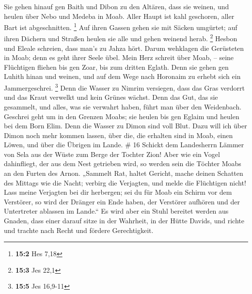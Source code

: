 Sie gehen hinauf gen Baith und Dibon zu den Altären, dass
sie weinen, und heulen über Nebo und Medeba in Moab. Aller Haupt ist
kahl geschoren, aller Bart ist abgeschnitten. \footnote{\textbf{15:2}
  Hes 7,18}  Auf ihren Gassen gehen sie mit Säcken umgürtet;
auf ihren Dächern und Straßen heulen sie alle und gehen weinend herab.
\footnote{\textbf{15:3} Jes 22,1}  Hesbon und Eleale
schreien, dass man's zu Jahza hört. Darum wehklagen die Gerüsteten in
Moab; denn es geht ihrer Seele übel.  Mein Herz schreit über
Moab, -- seine Flüchtigen fliehen bis gen Zoar, bis zum dritten Eglath.
Denn sie gehen gen Luhith hinan und weinen, und auf dem Wege nach
Horonaim zu erhebt sich ein Jammergeschrei. \footnote{\textbf{15:5} Jes
  16,9-11}  Denn die Wasser zu Nimrim versiegen, dass das
Gras verdorrt und das Kraut verwelkt und kein Grünes wächst.
 Denn das Gut, das sie gesammelt, und alles, was sie
verwahrt haben, führt man über den Weidenbach.  Geschrei
geht um in den Grenzen Moabs; sie heulen bis gen Eglaim und heulen bei
dem Born Elim.  Denn die Wasser zu Dimon sind voll Blut.
Dazu will ich über Dimon noch mehr kommen lassen, über die, die erhalten
sind in Moab, einen Löwen, und über die Übrigen im Lande. \# 16
 Schickt dem Landesherrn Lämmer von Sela aus der Wüste zum
Berge der Tochter Zion!  Aber wie ein Vogel dahinfliegt, der
aus dem Nest getrieben wird, so werden sein die Töchter Moabs an den
Furten des Arnon.  „Sammelt Rat, haltet Gericht, mache
deinen Schatten des Mittags wie die Nacht; verbirg die Verjagten, und
melde die Flüchtigen nicht!  Lass meine Verjagten bei dir
herbergen; sei du für Moab ein Schirm vor dem Verstörer, so wird der
Dränger ein Ende haben, der Verstörer aufhören und der Untertreter
ablassen im Lande.``  Es wird aber ein Stuhl bereitet werden
aus Gnaden, dass einer darauf sitze in der Wahrheit, in der Hütte
Davids, und richte und trachte nach Recht und fördere Gerechtigkeit.

